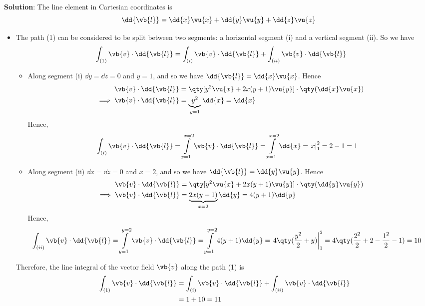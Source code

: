		\textbf{Solution}: The line element in Cartesian coordinates is
		$$\dd{\vb{l}}=\dd{x}\vu{x}+\dd{y}\vu{y}+\dd{z}\vu{z}$$
		\begin{itemize}
			\item The path (1) can be considered to be split between two segments: a horizontal segment (i) and a vertical segment (ii). So we have
			\begin{align*}
				\int_{(1)}{\vb{v}\cdot\dd{\vb{l}}}&=\int_{(i)}{\vb{v}\cdot\dd{\vb{l}}}+\int_{(ii)}{\vb{v}\cdot\dd{\vb{l}}}
			\end{align*}
			\begin{itemize}
				\item Along segment (i) $\dd{y}=\dd{z}=0$ and $y=1$, and so we have $\dd{\vb{l}}=\dd{x}\vu{x}$. Hence
				\begin{align*}
					\vb{v}\cdot\dd{\vb{l}}&=\qty[y^2\vu{x}+2x(y+1)\vu{y}]\cdot\qty(\dd{x}\vu{x}) \\
					\implies\vb{v}\cdot\dd{\vb{l}}&=\underbrace{y^2}_{y=1}\dd{x}=\dd{x}
				\end{align*}
				Hence,
				\begin{align*}
					\int_{(i)}{\vb{v}\cdot\dd{\vb{l}}}=\int\limits_{x=1}^{x=2}{\vb{v}\cdot\dd{\vb{l}}}&=\int\limits_{x=1}^{x=2}{\dd{x}}=\left.x\right|_{1}^{2}=2-1=1
				\end{align*}
				\item Along segment (ii) $\dd{x}=\dd{z}=0$ and $x=2$, and so we have $\dd{\vb{l}}=\dd{y}\vu{y}$. Hence
				\begin{align*}
					\vb{v}\cdot\dd{\vb{l}}&=\qty[y^2\vu{x}+2x(y+1)\vu{y}]\cdot\qty(\dd{y}\vu{y}) \\
					\implies\vb{v}\cdot\dd{\vb{l}}&=\underbrace{2x(y+1)}_{x=2}\dd{y}=4(y+1)\dd{y}
				\end{align*}
				Hence,
				\begin{align*}
					\int_{(ii)}{\vb{v}\cdot\dd{\vb{l}}}=\int\limits_{y=1}^{y=2}{\vb{v}\cdot\dd{\vb{l}}}&=\int\limits_{y=1}^{y=2}{4(y+1)\dd{y}}=\left.4\qty(\dfrac{y^2}{2}+y)\right|_{1}^{2}=4\qty(\dfrac{2^2}{2}+2-\dfrac{1^2}{2}-1)=10
				\end{align*}
			\end{itemize}
			Therefore, the line integral of the vector field $\vb{v}$ along the path (1) is
			\begin{align*}
				\int_{(1)}{\vb{v}\cdot\dd{\vb{l}}}&=\int_{(i)}{\vb{v}\cdot\dd{\vb{l}}}+\int_{(ii)}{\vb{v}\cdot\dd{\vb{l}}} \\
					&=1+10=11
			\end{align*}
			

\end{itemize}
